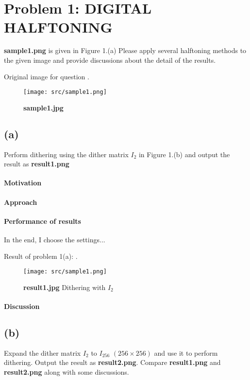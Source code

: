 \section{Problem 1: DIGITAL HALFTONING}\label{problem-1-digital-halftoning}
\textbf{sample1.png} is given in Figure 1.(a) Please apply several halftoning methods to the given image and provide discussions about the detail of the results.

Original image  for question .
\begin{figure}
    \centering
    \texttt{[image: src/sample1.png]}
    \caption{\textbf{sample1.jpg}}
    \label{sample1}
\end{figure}

\subsection{(a)}\label{1_a}
Perform dithering using the dither matrix \(I_{2}\) in Figure 1.(b) and output the result as \textbf{result1.png}

\paragraph{Motivation}

\paragraph{Approach}

\paragraph{Performance of results}
In the end, I choose the \alert{settings}...

Result of problem 1(a): .
\begin{figure}
    \centering
    \texttt{[image: src/sample1.png]}
    \caption{\textbf{result1.jpg} Dithering with \(I_{2}\)}
    \label{result2}
\end{figure}

\paragraph{Discussion}

\subsection{(b)}\label{1_b}
Expand the dither matrix \(I_{2}\) to \(I_{256}\) \((256 \times 256)\) and use it to perform dithering. Output the result as \textbf{result2.png}. Compare \textbf{result1.png} and \textbf{result2.png} along with some discussions.

